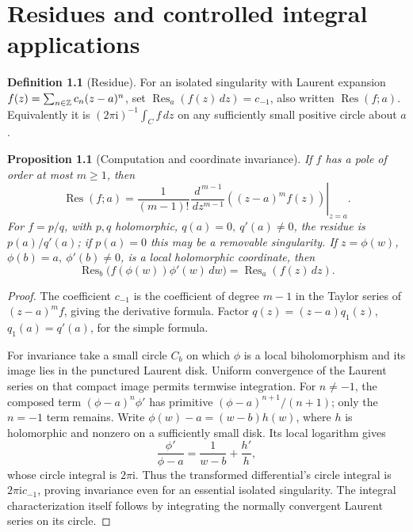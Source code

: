 \documentclass[11pt,a4paper,openany]{book}
\newtheorem{proposition}[theorem]{Proposition}
\theoremstyle{definition}
\newtheorem{definition}[theorem]{Definition}
\theoremstyle{remark}\newtheorem{remark}[theorem]{Remark}
\newcommand{\dd}{\,d}\newcommand{\iu}{\mathrm i}
\DeclareMathOperator{\Res}{Res}\DeclareMathOperator{\ind}{ind}
\newcommand{\family}[1]{}
\begin{document}

\chapter{Residues and controlled integral applications}\label{ch:d12-08}

\begin{definition}[Residue]\family{D12.08.01}\label{d12:08-01}
For an isolated singularity with Laurent expansion
\(f(z)=\sum_{n\in\mathbb Z}c_n(z-a)^n\), set
\(\Res_a(f(z)\dd z)=c_{-1}\), also written \(\Res(f;a)\).
Equivalently it is \((2\pi\iu)^{-1}\int_C f\dd z\) on any sufficiently
small positive circle about \(a\).
\end{definition}
\begin{proposition}[Computation and coordinate invariance]\label{d12:08-01-formulas}
If \(f\) has a pole of order at most \(m\ge1\), then
\[
 \Res(f;a)=\frac1{(m-1)!}
  \left.\frac{\dd^{\,m-1}}{\dd z^{m-1}}
             ((z-a)^m f(z))\right|_{z=a}.
\]
For \(f=p/q\), with \(p,q\) holomorphic,
\(q(a)=0,\ q'(a)\ne0\), the residue is \(p(a)/q'(a)\);
if \(p(a)=0\) this may be a removable singularity.
If \(z=\phi(w)\), \(\phi(b)=a,\ \phi'(b)\ne0\), is a local
holomorphic coordinate, then
\[
 \Res_b\bigl(f(\phi(w))\phi'(w)\dd w\bigr)
       =\Res_a(f(z)\dd z).
\]
\end{proposition}
\begin{proof}
The coefficient \(c_{-1}\) is the coefficient of degree \(m-1\)
in the Taylor series of \((z-a)^mf\), giving the derivative formula.
Factor \(q(z)=(z-a)q_1(z)\), \(q_1(a)=q'(a)\), for the simple formula.

For invariance take a small circle \(C_b\) on which \(\phi\) is a local
biholomorphism and its image lies in the punctured Laurent disk.
Uniform convergence of the Laurent series on that compact image permits
termwise integration. For \(n\ne-1\), the composed term
\((\phi-a)^n\phi'\) has primitive
\((\phi-a)^{n+1}/(n+1)\); only the \(n=-1\) term remains.
Write \(\phi(w)-a=(w-b)h(w)\), where \(h\) is holomorphic and nonzero
on a sufficiently small disk. Its local logarithm gives
\[
 \frac{\phi'}{\phi-a}=\frac1{w-b}+\frac{h'}h,
\]
whose circle integral is \(2\pi\iu\). Thus the transformed differential's
circle integral is \(2\pi\iu c_{-1}\), proving invariance even for an
essential isolated singularity.
The integral characterization itself follows by integrating the normally
convergent Laurent series on its circle.
\end{proof}
\end{document}
